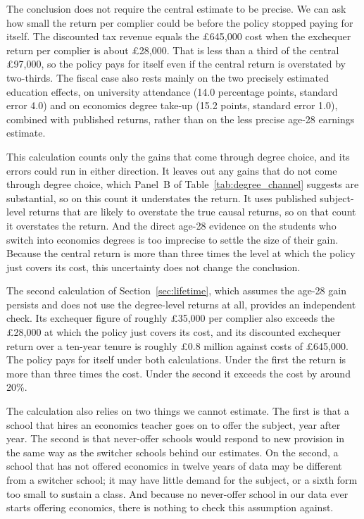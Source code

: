 The conclusion does not require the central estimate to be precise. We can ask how small the return per complier could be before the policy stopped paying for itself. The discounted tax revenue equals the \pounds 645,000 cost when the exchequer return per complier is about \pounds 28,000. That is less than a third of the central \pounds 97,000, so the policy pays for itself even if the central return is overstated by two-thirds. The fiscal case also rests mainly on the two precisely estimated education effects, on university attendance (14.0 percentage points, standard error 4.0) and on economics degree take-up (15.2 points, standard error 1.0), combined with published returns, rather than on the less precise age-28 earnings estimate.

This calculation counts only the gains that come through degree choice, and its errors could run in either direction. It leaves out any gains that do not come through degree choice, which Panel~B of Table~\ref{tab:degree_channel} suggests are substantial, so on this count it understates the return. It uses published subject-level returns that are likely to overstate the true causal returns, so on that count it overstates the return. And the direct age-28 evidence on the students who switch into economics degrees is too imprecise to settle the size of their gain. Because the central return is more than three times the level at which the policy just covers its cost, this uncertainty does not change the conclusion.

The second calculation of Section~\ref{sec:lifetime}, which assumes the age-28 gain persists and does not use the degree-level returns at all, provides an independent check. Its exchequer figure of roughly \pounds 35,000 per complier also exceeds the \pounds 28,000 at which the policy just covers its cost, and its discounted exchequer return over a ten-year tenure is roughly \pounds 0.8 million against costs of \pounds 645,000. The policy pays for itself under both calculations. Under the first the return is more than three times the cost. Under the second it exceeds the cost by around 20\%.

The calculation also relies on two things we cannot estimate. The first is that a school that hires an economics teacher goes on to offer the subject, year after year. The second is that never-offer schools would respond to new provision in the same way as the switcher schools behind our estimates. On the second, a school that has not offered economics in twelve years of data may be different from a switcher school; it may have little demand for the subject, or a sixth form too small to sustain a class. And because no never-offer school in our data ever starts offering economics, there is nothing to check this assumption against.

